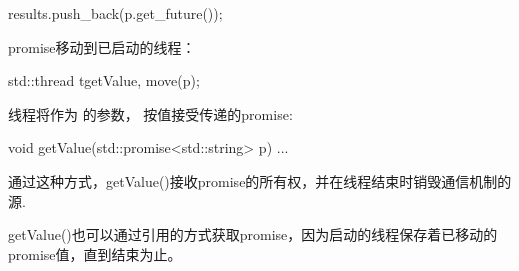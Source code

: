 \begin{cppcode}
results.push_back(p.get_future());
\end{cppcode}

promise移动到已启动的线程：

\begin{cppcode}
std::thread t{getValue, move(p)};
\end{cppcode}

线程将作为  的参数， 按值接受传递的promise:

\begin{cppcode}
void getValue(std::promise<std::string> p)
{
	...
}
\end{cppcode}

通过这种方式，getValue()接收promise的所有权，并在线程结束时销毁通信机制的源.

getValue()也可以通过引用的方式获取promise，因为启动的线程保存着已移动的promise值，直到结束为止。














